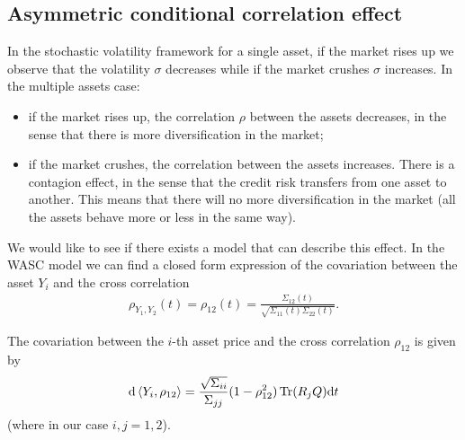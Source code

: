 \subsection{Asymmetric conditional correlation effect}
In the stochastic volatility framework for a single asset, if the market rises up we observe that the volatility $\sigma$ decreases while if the market crushes $\sigma$ increases. In the multiple assets case:
\begin{itemize}
    \item if the market rises up, the correlation $\rho$ between the assets decreases, in the sense that there is more diversification in the market;
    \item if the market crushes, the correlation between the assets increases. There is a contagion effect, in the sense that the credit risk transfers from one asset to another. This means that there will no more diversification in the market (all the assets behave more or less in the same way).
\end{itemize}
We would like to see if there exists a model that can describe this effect. In the WASC model we can find a closed form expression of the covariation between the asset $Y_i$ and the cross correlation
\begin{align}
    \rho_{Y_1,Y_2}(t) = \rho_{12}(t) = \frac{\Sigma_{12}(t)}{\sqrt{\Sigma_{11}(t)\Sigma_{22}(t)}}.
\end{align}
\begin{proposition}
    The covariation between the $i$-th asset price and the cross correlation $\rho_{12}$ is given by
    \begin{align}
        \dd\expval{Y_i,\rho_{12}} = \frac{\sqrt{\Sigma_{ii}}}{\Sigma_{jj}}(1-\rho_{12}^2)\Tr(R_jQ)\dd t
    \end{align}
    (where in our case $i,j=1,2$).
\end{proposition}
